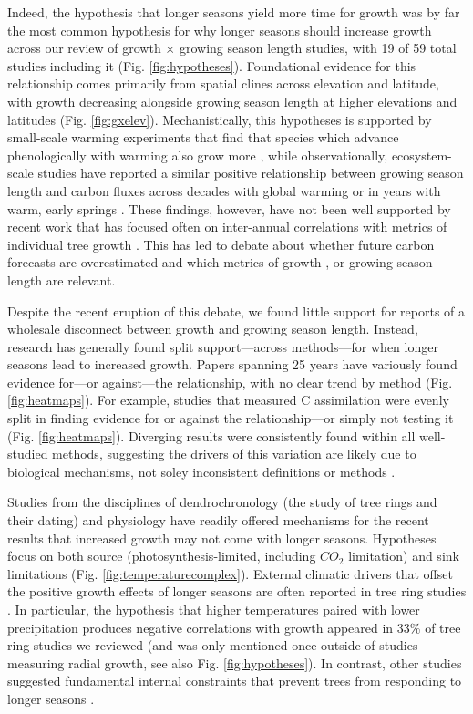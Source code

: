 \documentclass[11pt]{article}
\begin{document}
Indeed, the hypothesis that longer seasons yield more time for growth was by far the most common hypothesis for why longer seasons should increase growth across our review of growth $\times$ growing season length studies, with 19 of 59 total studies including it (Fig. \ref{fig:hypotheses}). Foundational evidence for this relationship comes primarily from spatial clines across elevation and latitude, with growth decreasing alongside growing season length at higher elevations and latitudes (Fig. \ref{fig:gxelev}). Mechanistically, this hypotheses is supported by small-scale warming experiments that find that species which advance phenologically with warming also grow more \citep[][]{Cleland:2012}, while observationally, ecosystem-scale studies have reported a similar positive relationship between growing season length and carbon fluxes across decades with global warming \citep{keenan2014net} or in years with warm, early springs \citep{chen1999effects}. These findings, however, have not been well supported by recent work that has focused often on inter-annual correlations with metrics of individual tree growth \citep{dow2022warm,silvestro2023longer}. This has led to debate about whether future carbon forecasts are overestimated and which metrics of growth \citep{green2022limits}, or growing season length \citep{korner2023four} are relevant.

Despite the recent eruption of this debate, we found little support for reports of a wholesale disconnect between growth and growing season length. Instead, research has generally found split support---across methods---for when longer seasons lead to increased growth. Papers spanning 25 years have variously found evidence for---or against---the relationship, with no clear trend by method (Fig. \ref{fig:heatmaps}). For example, studies that measured C assimilation were evenly split in finding evidence for or against the relationship---or simply not testing it (Fig. \ref{fig:heatmaps}). Diverging results were consistently found within all well-studied methods, suggesting the drivers of this variation are likely due to biological mechanisms, not soley inconsistent definitions or methods \citep[as recently suggested,][]{korner2023four}. 

Studies from the disciplines of dendrochronology (the study of tree rings and their dating) and physiology have readily offered mechanisms for the recent results that increased growth may not come with longer seasons. Hypotheses focus on both source (photosynthesis-limited, including $CO_2$ limitation) and sink limitations (Fig. \ref{fig:temperaturecomplex}). External climatic drivers that offset the positive growth effects of longer seasons are often reported in tree ring studies \citep{kolavr2016response,de2022temperature,camarero2022decoupled}. In particular, the hypothesis that higher temperatures paired with lower precipitation produces negative correlations with growth appeared in 33\% of tree ring studies we reviewed (and was only mentioned once outside of studies measuring radial growth, see also Fig. \ref{fig:hypotheses}). In contrast, other studies suggested fundamental internal constraints that prevent trees from responding to longer seasons \citep[][]{cuny2012life,michelot2012comparing,zohner2023effect}. 
\end{document}
